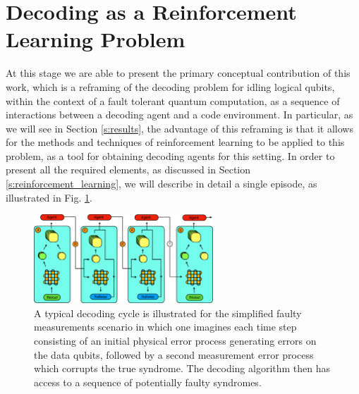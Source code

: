 \documentclass[twocolumn,preprintnumbers,amsmath,amssymb,notitlepage,nofootinbib,longbibliography,superscriptaddress,aps,pra,10pt]{revtex4-1}
\begin{document}
\section{Decoding as a Reinforcement Learning Problem}\label{s:decoding_as_rl}

    At this stage we are able to present the primary conceptual contribution of this work, which is a reframing of the decoding problem for idling logical qubits, within the context of a fault tolerant quantum computation, as a sequence of interactions between a decoding agent and a code environment.
    In particular, as we will see in Section \ref{s:results}, the advantage of this reframing is that it allows for the methods and techniques of reinforcement learning to be applied to this problem, as a tool for obtaining decoding agents for this setting. 
    In order to present all the required elements, as discussed in Section \ref{s:reinforcement_learning}, we will describe in detail a single episode, as illustrated in Fig. \ref{f:single_episode}.

    \begin{figure}
      \centering
      \includegraphics[width=0.6\textwidth]{figures/decoding_as_rl.pdf}
      \caption{A typical decoding cycle is illustrated for the simplified faulty measurements scenario in which one imagines each time step consisting of an initial physical error process generating errors on the data qubits, followed by a second measurement error process which corrupts the true syndrome. The decoding algorithm then has access to a sequence of potentially faulty syndromes.}\label{f:single_episode}
    \end{figure}
\end{document}

